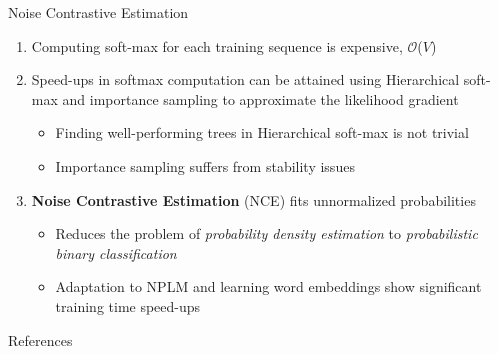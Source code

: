 \documentclass[10pt]{beamer}
\newcommand{\setW}{\ensuremath{V} }
\begin{document}
\begin{frame}{Noise Contrastive Estimation}
\vfill
\begin{enumerate}
	\vfill\item<1-> Computing soft-max for each training sequence is expensive, $\mathcal{O}$($\setW$)
	\vfill\item<2-> Speed-ups in softmax computation can be attained using Hierarchical soft-max \citep{morin2005hierarchical} and importance sampling to approximate the likelihood gradient \citep{bengio2003quick, bengio2008adaptive}
	\begin{itemize}
		\vfill\item<3-> Finding well-performing trees in Hierarchical soft-max is not trivial
		\vfill\item<4-> Importance sampling suffers from stability issues
	\end{itemize}
	\vfill\item<4-> \textbf{Noise Contrastive Estimation} (NCE) \citep{gutmann2012noise} fits unnormalized probabilities
	\begin{itemize}
		\vfill\item<5-> Reduces the problem of \emph{probability density estimation} to \emph{probabilistic binary classification}
		\vfill\item<6-> Adaptation to NPLM \citep{mnih2012fast} and learning word embeddings \citep{mnih2013learning} show significant training time speed-ups
	\end{itemize}
\end{enumerate}
\end{frame}


\begin{frame}{References}
    
    
\end{frame}
\end{document}
